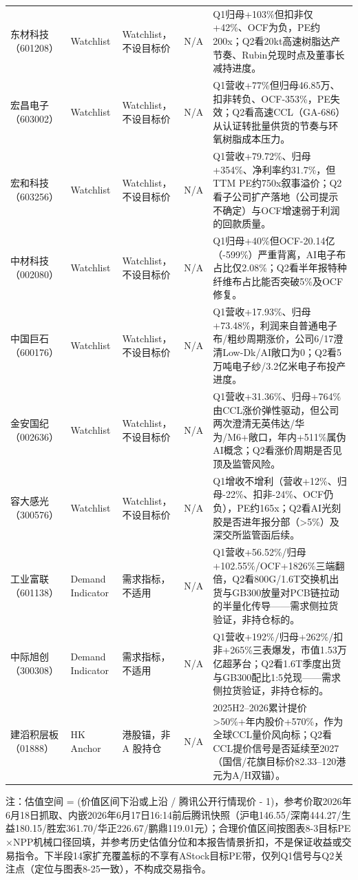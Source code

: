 \begin{exhibitbox}
\begin{tabularx}{\textwidth}{L{2.0cm}L{1.6cm}L{2.4cm}L{2.2cm}X}
东材科技（601208） & Watchlist & Watchlist，不设目标价 & N/A & Q1归母+103\%但扣非仅+42\%、OCF为负，PE约200x；Q2看20kt高速树脂达产节奏、Rubin兑现时点及董事长减持进度。 \\
宏昌电子（603002） & Watchlist & Watchlist，不设目标价 & N/A & Q1营收+77\%但归母46.85万、扣非转负、OCF-353\%，PE失效；Q2看高速CCL（GA-686）从认证转批量供货的节奏与环氧树脂成本压力。 \\
宏和科技（603256） & Watchlist & Watchlist，不设目标价 & N/A & Q1营收+79.72\%、归母+354\%、净利率约31.7\%，但TTM PE约750x叙事溢价；Q2看子公司扩产落地（公司提示不确定）与OCF增速弱于利润的回款质量。 \\
中材科技（002080） & Watchlist & Watchlist，不设目标价 & N/A & Q1归母+40\%但OCF-20.14亿（-599\%）严重背离，AI电子布占比仅2.08\%；Q2看半年报特种纤维布占比能否突破5\%及OCF修复。 \\
中国巨石（600176） & Watchlist & Watchlist，不设目标价 & N/A & Q1营收+17.93\%、归母+73.48\%，利润来自普通电子布/粗纱周期涨价，公司6/17澄清Low-Dk/AI敞口为0；Q2看5万吨电子纱/3.2亿米电子布投产进度。 \\
金安国纪（002636） & Watchlist & Watchlist，不设目标价 & N/A & Q1营收+31.36\%、归母+764\%由CCL涨价弹性驱动，但公司两次澄清无英伟达/华为/M6+敞口，年内+511\%属伪AI概念；Q2看涨价周期是否见顶及监管风险。 \\
容大感光（300576） & Watchlist & Watchlist，不设目标价 & N/A & Q1增收不增利（营收+12\%、归母-22\%、扣非-24\%、OCF仍负），PE约165x；Q2看AI光刻胶是否进年报分部（>5\%）及深交所监管函后续。 \\
工业富联（601138） & Demand Indicator & 需求指标，不适用 & N/A & Q1营收+56.52\%/归母+102.55\%/OCF+1826\%三端翻倍，Q2看800G/1.6T交换机出货与GB300放量对PCB链拉动的半量化传导——需求侧拉货验证，非持仓标的。 \\
中际旭创（300308） & Demand Indicator & 需求指标，不适用 & N/A & Q1营收+192\%/归母+262\%/扣非+265\%三表爆发，市值1.53万亿超茅台；Q2看1.6T季度出货与GB300配比1:5兑现——需求侧拉货验证，非持仓标的。 \\
建滔积层板（01888） & HK Anchor & 港股锚，非 A 股持仓 & N/A & 2025H2--2026累计提价>50\%+年内股价+570\%，作为全球CCL量价风向标；Q2看CCL提价信号是否延续至2027（国信/花旗目标价82.33--120港元为A/H双锚）。 \\
\bottomrule
\end{tabularx}
\vspace{0.3em}
\scriptsize 注：估值空间 = (价值区间下沿或上沿 / 腾讯公开行情现价 - 1)，参考价取2026年6月18日抓取、内嵌2026年6月17日16:14前后腾讯快照（沪电146.55/深南444.27/生益180.15/胜宏361.70/华正226.67/鹏鼎119.01元）；合理价值区间按图表8-3目标PE$\times$NPP机械口径回填，并参考历史估值分位和本报告情景折扣，不是保证收益或交易指令。下半段14家扩充覆盖标的不享有AStock目标PE带，仅列Q1信号与Q2关注点（定位与图表8-25一致），不构成交易指令。
\end{exhibitbox}

